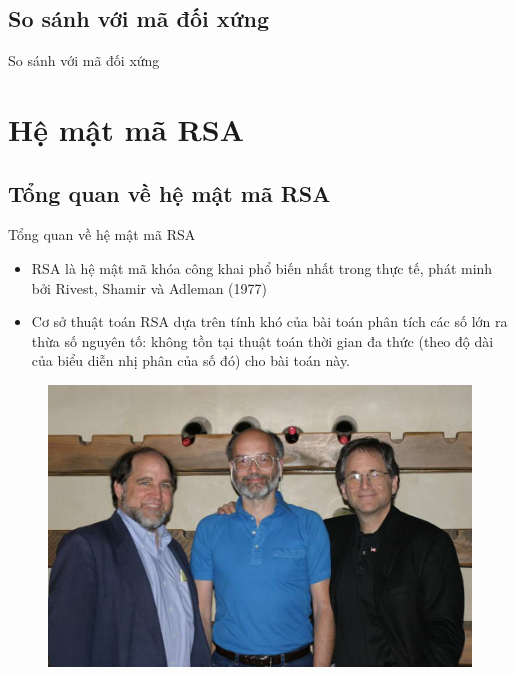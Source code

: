 \documentclass{beamer}
\numberwithin{equation}{section}
\begin{document}
\subsection{So sánh với mã đối xứng}
\begin{frame}{So sánh với mã đối xứng}

\end{frame}
\section{Hệ mật mã RSA}
\subsection{Tổng quan về hệ mật mã RSA}
\begin{frame}{Tổng quan về hệ mật mã RSA}

\begin{itemize}
\item RSA là hệ mật mã khóa công khai phổ biến nhất trong thực tế, phát minh bởi Rivest, Shamir và Adleman (1977)
\item Cơ sở thuật toán RSA dựa trên tính khó của bài toán phân tích các số lớn ra thừa số nguyên tố: không tồn tại thuật toán thời gian đa thức (theo độ dài của biểu diễn nhị phân của số đó) cho bài toán này.
\end{itemize}

\begin{figure}[H]
\centering
\includegraphics[scale = 0.4]{pictures/RSA_RonRivestAdiShamirLeonardAdleman.png}
\end{figure}

\end{frame}
\end{document}
